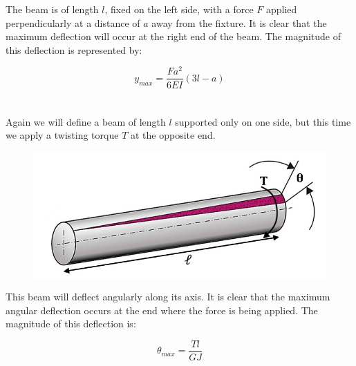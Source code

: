 \documentclass[a4paper]{article}
\begin{document}
	The beam is of length $ l $, fixed on the left side, with a force $ F $ applied perpendicularly at a distance of $ a $ away from the fixture. It is clear that the maximum deflection will occur at the right end of the beam. The magnitude of this deflection is represented by:
	
	\begin{equation}
		y_{max} = \frac{F a^2}{6 EI} \left( 3l - a \right)
	\end{equation}\\\\
	
	
	Again we will define a beam of length $ l $ supported only on one side, but this time we apply a twisting torque $ T $ at the opposite end.
	
	\begin{figure}[H]
		\centering
		\includegraphics[width=0.7\linewidth]{beam_bend_twist}
	\end{figure}

	This beam will deflect angularly along its axis. It is clear that the maximum angular deflection occurs at the end where the force is being applied. The magnitude of this deflection is:
	
	\begin{equation}
		\theta_{max} = \frac{T l}{GJ}
	\end{equation}\\
	
	
	
	
\end{document}
